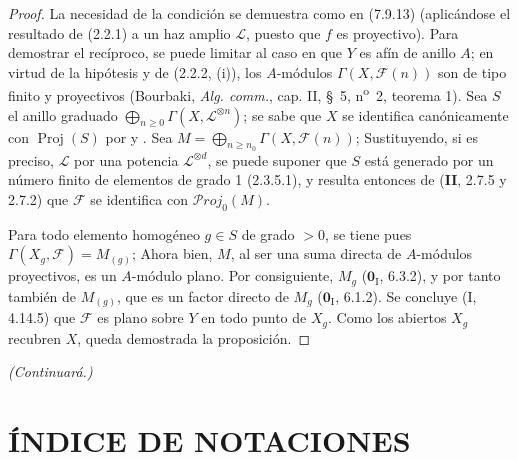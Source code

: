 \documentclass[10pt,oneside,openany]{book}
\theoremstyle{egaenv}\newtheorem*{env}{---}
\theoremstyle{egastatement}
\theoremstyle{egadescription}
\newcommand{\oldpage}[2][]{\marginnote{\normalfont\scriptsize\textbf{#1}\,|\,#2}\ignorespaces}
\renewcommand{\geq}{\geqslant}
\begin{document}
\begin{proof}
La necesidad de la condición se demuestra como en (7.9.13) (aplicándose el resultado de
(2.2.1) a un haz amplio $\mathscr L$, puesto que $f$ es
proyectivo). Para demostrar el recíproco, se puede limitar al caso en que $Y$ es
afín de anillo $A$; en virtud de la hipótesis y de (2.2.2, (i)), los
$A$-módulos
$\Gamma(X,\mathscr F(n))$ son de tipo finito y proyectivos (Bourbaki,
\emph{Alg. comm.}, cap. II, \S~5, n\textsuperscript{o}~2, teorema 1). Sea $S$
el anillo graduado $\bigoplus_{n\geq0}\Gamma(X,\mathscr L^{\otimes n})$;
se sabe que $X$ se identifica
canónicamente con $\operatorname{Proj}(S)$ por
 y . Sea
$M=\bigoplus_{n\geq n_0}\Gamma(X,\mathscr F(n))$;
Sustituyendo, si es preciso, $\mathscr L$ por una potencia
$\mathscr L^{\otimes d}$, se puede suponer que $S$ está generado por un número finito de elementos de grado 1
(2.3.5.1), y resulta entonces de (\textbf{II}, 2.7.5 y 2.7.2) que $\mathscr F$ se
identifica con $\mathscr P\!roj_0(M)$.

Para todo elemento homogéneo $g\in S$ de
grado $>0$, se tiene pues $\Gamma(X_g,\mathscr F)=M_{(g)}$;
Ahora bien, $M$, al ser una suma directa de $A$-módulos
proyectivos, es un $A$-módulo plano. Por consiguiente, $M_g$ ($\mathbf{0}_{\mathrm I}$, 6.3.2), y por tanto también de $M_{(g)}$, que es un
factor directo de $M_g$ ($\mathbf{0}_{\mathrm I}$, 6.1.2). Se concluye (I, 4.14.5) que
$\mathscr F$ es plano sobre $Y$ en todo
punto de $X_g$. Como los abiertos $X_g$ recubren $X$, queda
demostrada la proposición.
\end{proof}

\bigskip
\noindent\emph{(Continuará.)}

\clearpage
\oldpage[III]{213}

\section*{ÍNDICE DE NOTACIONES}
\end{document}
